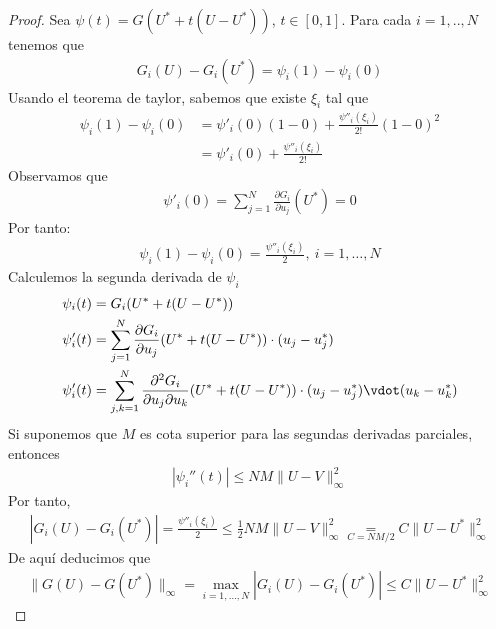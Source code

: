 \begin{proof}
Sea $\psi(t) = G(U^* + t(U-U^*))$, $t \in [0,1]$. Para cada $i = 1,..,N$ tenemos que
\begin{align*}
    G_i(U) - G_i(U^*) = \psi_i(1) - \psi_i(0)
\end{align*}
Usando el teorema de taylor, sabemos que existe $\xi_i$ tal que
\begin{align*}
    \psi_i(1) - \psi_i(0) &= \psi'_i(0)(1-0) + \frac{\psi''_i(\xi_i)}{2!} (1-0)^2 \\
    &= \psi'_i(0) + \frac{\psi''_i(\xi_i)}{2!}
\end{align*}
Observamos que 
\begin{align*}
    \psi'_i(0) = \sum_{j=1}^{N} \frac{\partial G_i}{\partial u_j}(U^*) = 0
\end{align*}
Por tanto:
\begin{align*}
    \psi_i(1) - \psi_i(0) = \frac{\psi''_i(\xi_i)}{2}, \ i = 1,\ldots,N
\end{align*}
Calculemos la segunda derivada de $\psi_i$
\begin{align*}
    & \psi_i(t) = G_i(U^* + t(U-U^*)) \\
    & \psi'_i(t) = \sum_{j=1}^{N} \frac{\partial G_i}{\partial u_j}(U^* + t(U-U^*)) \cdot (u_j - u_j^*) \\
    & \psi'_i(t) = \sum_{j,k=1}^{N} \frac{\partial^2 G_i}{\partial u_j\partial u_k}(U^* + t(U-U^*)) \cdot (u_j - u_j^*) \vdot (u_k - u_k^*)
\end{align*}
Si suponemos que $M$ es cota superior para las segundas derivadas parciales, entonces
\begin{align*}
    |\psi_i''(t)| \leq N M \|U - V\|_{\infty}^2
\end{align*}
Por tanto,
\begin{align*}
    |G_i(U) - G_i(U^*)| = \frac{\psi''_i(\xi_i)}{2} \leq \frac{1}{2} NM \|U - V\|_{\infty}^2 \underset{C = NM/2}{=} C\|U-U^*\|_{\infty}^2
\end{align*}
De aquí deducimos que
\begin{align*}
    \|G(U) - G(U^*)\|_{\infty} = \max_{i = 1,\ldots,N} |G_i(U) - G_i(U^*)| \leq C \|U-U^*\|_{\infty}^2
\end{align*}
\end{proof}

